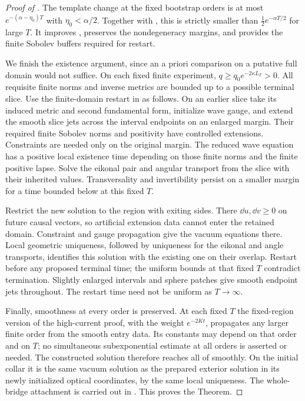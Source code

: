 \begin{proof}[Proof of ]
The template change at the fixed bootstrap orders is at most
$e^{-(\alpha-\eta_0)T}$ with $\eta_0<\alpha/2$.
Together with , this is strictly smaller
than $\tfrac12 e^{-\alpha T/2}$ for large $T$.  It improves
, preserves the nondegeneracy margins, and
provides the finite Sobolev buffers required for restart.

We finish the existence argument, since an a priori comparison on
a putative full domain would not suffice.  On each fixed finite
experiment, $q\ge q_0e^{-2\kappa L_T}>0$.  All requisite finite
norms and inverse metrics are bounded up to a possible terminal
slice.  Use the finite-domain restart in
\cite[, proof]{KerrCTwo} as follows.
On an earlier slice take its induced metric and second fundamental
form, initialize wave gauge, and extend the smooth slice jets
across the interval endpoints on an enlarged margin.  Their
required finite Sobolev norms and positivity have controlled
extensions.  Constraints are needed only on the original margin.
The reduced wave equation has a positive local existence time
depending on those finite norms and the finite positive lapse.
Solve the eikonal pair and angular transport from the slice with
their inherited values.  Transversality and invertibility persist
on a smaller margin for a time bounded below at this fixed $T$.

Restrict the new solution to the region with exiting sides.
There $\dd u,\dd v\ge0$ on future causal vectors, so artificial
extension data cannot enter the retained domain.  Constraint and
gauge propagation give the vacuum equations there.  Local
geometric uniqueness, followed by uniqueness for the eikonal and
angle transports, identifies this solution with the existing one
on their overlap.  Restart before any proposed terminal time;
the uniform bounds at that fixed $T$ contradict termination.
Slightly enlarged intervals and sphere patches give smooth
endpoint jets throughout.  The restart time need not be uniform
as $T\to\infty$.

Finally, smoothness at every order is preserved.  At each fixed
$T$ the fixed-region version of the high-current proof, with the
weight $e^{-2Kt}$, propagates any larger finite order from the
smooth entry data.  Its constants may depend on that order and
on $T$; no simultaneous subexponential estimate at all orders
is asserted or needed.  The constructed solution therefore
reaches all of  smoothly.  On the initial collar
it is the same vacuum solution as the prepared exterior solution
in its newly initialized optical coordinates, by the same local
uniqueness.  The whole-bridge attachment is carried out in
.  This proves the Theorem.
\end{proof}
